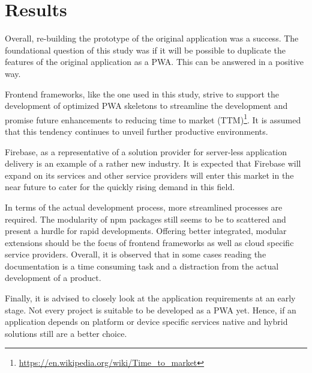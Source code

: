 \chapter{Results}

Overall, re-building the prototype of the original application was a success. The foundational question of this study was if it will be possible to duplicate the features of the original application as a PWA. This can be answered in a positive way.

Frontend frameworks, like the one used in this study, strive to support the development of optimized PWA skeletons to streamline the development and promise future enhancements to reducing time to market (TTM)\footnote{\url{https://en.wikipedia.org/wiki/Time_to_market}}. It is assumed that this tendency continues to unveil further productive environments.

Firebase, as a representative of a solution provider for server-less application delivery is an example of a rather new industry. It is expected that Firebase will expand on its services and other service providers will enter this market in the near future to cater for the quickly rising demand in this field.

In terms of the actual development process, more streamlined processes are required. The modularity of npm packages still seems to be to scattered and present a hurdle for rapid developments. Offering better integrated, modular extensions should be the focus of frontend frameworks as well as cloud specific service providers. Overall, it is observed that in some cases reading the documentation is a time consuming task and a distraction from the actual development of a product.

Finally, it is advised to closely look at the application requirements at an early stage. Not every project is suitable to be developed as a PWA yet. Hence, if an application depends on platform or device specific services native and hybrid solutions still are a better choice.
